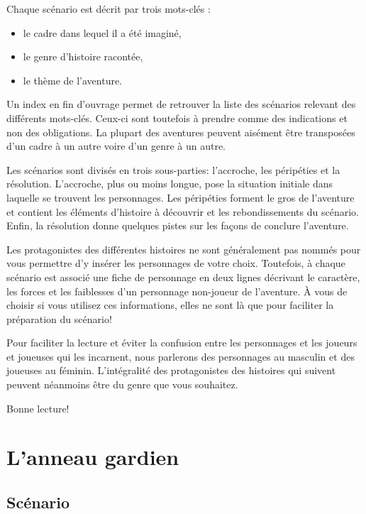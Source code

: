 \documentclass[a5paper,pagesize,10pt,bibliography=totoc,numbers=enddot,
headings=normal,DIV=9,twoside=false,tablecaptionabove]{scrbook}
\begin{document}
Chaque scénario est décrit par trois mots-clés :
\begin{itemize}
	\item le cadre dans lequel il a été imaginé,
	\item le genre d'histoire racontée,
	\item le thème de l'aventure.
\end{itemize}

Un index en fin d'ouvrage permet de retrouver la liste des scénarios relevant des différents mots-clés.
Ceux-ci sont toutefois à prendre comme des indications et non des obligations.
La plupart des aventures peuvent aisément être transposées d'un cadre à un autre voire d'un genre à un autre.

Les scénarios sont divisés en trois sous-parties: l'accroche, les péripéties et la résolution.
L'accroche, plus ou moins longue, pose la situation initiale dans laquelle se trouvent les personnages.
Les péripéties forment le gros de l'aventure et contient les éléments d'histoire à découvrir et les rebondissements du scénario.
Enfin, la résolution donne quelques pistes sur les façons de conclure l'aventure.

Les protagonistes des différentes histoires ne sont généralement pas nommés pour vous permettre d'y insérer les personnages de votre choix.
Toutefois, à chaque scénario est associé une fiche de personnage en deux lignes décrivant le caractère, les forces et les faiblesses d'un personnage non-joueur de l'aventure.
À vous de choisir si vous utilisez ces informations, elles ne sont là que pour faciliter la préparation du scénario!

Pour faciliter la lecture et éviter la confusion entre les personnages et les joueurs et joueuses qui les incarnent, nous parlerons des personnages au masculin et des joueuses au féminin.
L'intégralité des protagonistes des histoires qui suivent peuvent néanmoins être du genre que vous souhaitez.

Bonne lecture!

\setcounter{tocdepth}{0}
\tableofcontents

\chapter{L'anneau gardien}

\section{Scénario}
\end{document}
